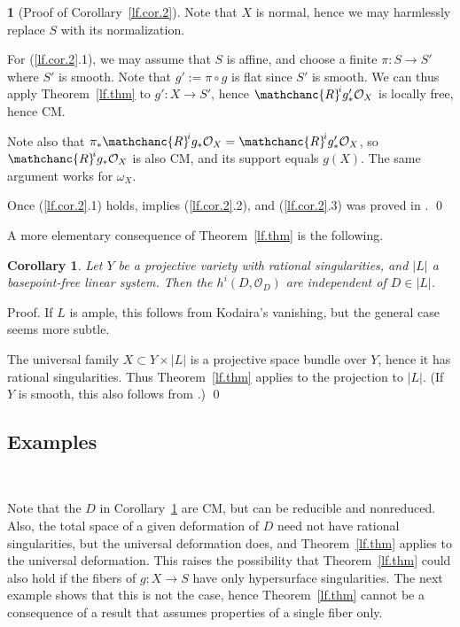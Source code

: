 \documentclass{amsart}
\newtheorem{cor}[thm]{Corollary}
\theoremstyle{definition}
\newtheorem{say}[thm]{}
\theoremstyle{remark}
\renewcommand{\o}[0]{{\mathcal O}}
\newcommand{\myR}{{\mathchanc{R}\!}}
\begin{document}
\begin {say}[Proof of Corollary~\ref{lf.cor.2}]\label{lf.cor.2.pf} Note that $X$ is normal, hence we may harmlessly replace $S$ with its normalization.  


  For (\ref{lf.cor.2}.1), we may assume that $S$ is affine, and choose a finite  $\pi:S\to S'$ where $S'$ is smooth.  Note that $g':=\pi\circ g$ is flat since $S'$ is smooth.
  We can thus apply Theorem~\ref{lf.thm} to  $g':X\to S'$, hence  $\myR^ig'_*\o_X$ is locally free, hence CM. 

  Note also that 
  $\pi_*\myR^ig_*\o_X=\myR^ig'_*\o_X$, so  $\myR^ig_*\o_X$ is also CM, and its support equals $g(X)$.
The same argument works for $\omega_X$.


Once (\ref{lf.cor.2}.1) holds, 
\cite[3.12]{k-hdi2} implies (\ref{lf.cor.2}.2),  and
(\ref{lf.cor.2}.3) was proved in \cite[3.1]{k-hdi2}. \qed
\end{say}



  \medskip
 A more elementary consequence of  Theorem~\ref{lf.thm} is the following.


 \begin{cor}\label{cor.0} Let $Y$ be a projective variety with rational singularities, and $|L|$ a basepoint-free linear system.
   Then  the $h^i(D, \o_D)$ are independent of $D\in |L|$.
 \end{cor}

 
 Proof.  If $L$ is ample, this follows from Kodaira's vanishing, but the general case seems more subtle.

 The universal family  $X\subset Y\times |L|$ is a projective space bundle over $Y$, hence it has rational singularities.  Thus
        Theorem~\ref{lf.thm} applies to the projection to $|L|$. 
 (If $Y$ is smooth, this also follows from  \cite[8.2]{k-hdi1}.) \qed
 \medskip




 \subsection*{Examples}{\ }
         \medskip

        Note that the $D$  in Corollary~\ref{cor.0} are CM, but can be reducible and nonreduced.
        Also, the total space of a  given deformation of $D$ need not have rational singularities, but the universal deformation does, and
        Theorem~\ref{lf.thm} applies to the  universal deformation.
       This raises the possibility that  Theorem~\ref{lf.thm} could also hold if the  fibers of $g:X\to S$ have only hypersurface singularities.
       The next example shows that  this is not the case, hence
        Theorem~\ref{lf.thm} cannot be a consequence of a result that assumes   properties of a single fiber only.
       
\end{document}
